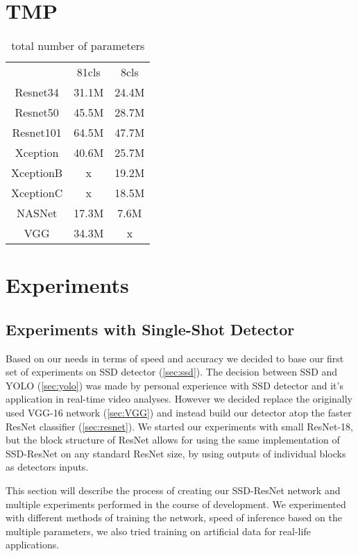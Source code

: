 \chapter{TMP}


\begin{table}
    \begin{tabular}{c|c|c}
                    & 81cls     & 8cls  \\
    Resnet34        & 31.1M     & 24.4M \\
    Resnet50        & 45.5M     & 28.7M \\
    Resnet101       & 64.5M     & 47.7M \\
    Xception        & 40.6M     & 25.7M \\
    XceptionB       & x         & 19.2M \\
    XceptionC       & x         & 18.5M \\
    NASNet          & 17.3M     & 7.6M  \\
    VGG             & 34.3M     & x \\
    \end{tabular}
    \caption{total number of parameters}
    \label{tab:parameters}
\end{table}


\chapter*{Experiments}
\section{Experiments with Single-Shot Detector}
\label{chapt:experiments}
Based on our needs in terms of speed and accuracy we decided to base our first set of experiments on SSD detector (\cref{sec:ssd}). The decision between SSD and YOLO (\cref{sec:yolo}) was made by personal experience with SSD detector and it's application in real-time video analyses. However we decided replace the originally used VGG-16 network (\cref{sec:VGG}) and instead build our detector atop the faster ResNet classifier (\cref{sec:resnet}). We started our experiments with small ResNet-18, but the block structure of ResNet allows for using the same implementation of SSD-ResNet on any standard ResNet size, by using outputs of individual blocks as detectors inputs.

This section will describe the process of creating our SSD-ResNet network and multiple experiments performed in the course of development. We experimented with different methods of training the network, speed of inference based on the multiple parameters, we also tried training on artificial data for real-life applications.


